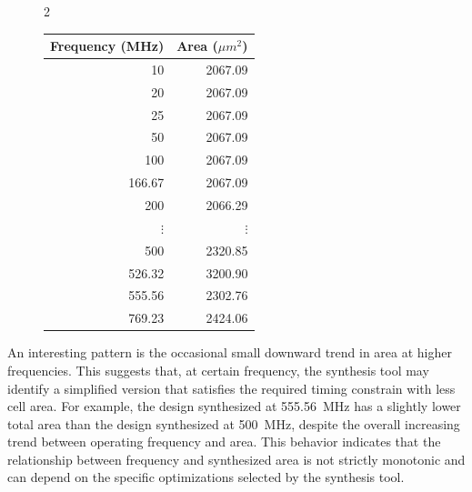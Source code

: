 \documentclass[a4paper,11pt]{article}
\begin{document}
\begin{figure}[!htbp]
    \centering

    \begin{multicols}{2}

        \centering
        

        \label{fig:frequency-area}

        \columnbreak

        \centering
        \begin{tabular}{rr}
            \toprule
            \textbf{Frequency (MHz)} & \textbf{Area ($\mu m^2$)} \\
            \midrule
            10     & 2067.09 \\
            20     & 2067.09 \\
            25     & 2067.09 \\
            50     & 2067.09 \\
            100    & 2067.09 \\
            166.67 & 2067.09 \\
            200    & 2066.29 \\
            $\vdots$ & $\vdots$ \\
            500    & 2320.85 \\
            526.32 & 3200.90 \\
            555.56 & 2302.76 \\
            769.23 & 2424.06 \\
            \bottomrule
        \end{tabular}

        \label{tab:frequency-area}

    \end{multicols}
\end{figure}
 

An interesting pattern is the occasional small downward trend in area at higher frequencies. This suggests that, at certain frequency, the synthesis tool may identify a simplified version that satisfies the required timing constrain with less cell area. For example, the design synthesized at 555.56~MHz has a slightly lower total area than the design synthesized at 500~MHz, despite the overall increasing trend between operating frequency and area. This behavior indicates that the relationship between frequency and synthesized area is not strictly monotonic and can depend on the specific optimizations selected by the synthesis tool.
\end{document}
